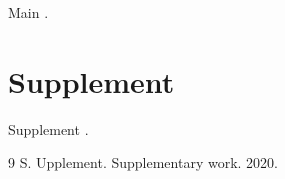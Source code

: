 \documentclass{article}
\begin{document}
Main \cite{knuth}.


\section*{Supplement}
Supplement \cite{supp}.
\begin{thebibliography}{9}
 S. Upplement. Supplementary work. 2020.
\end{thebibliography}
\end{document}
